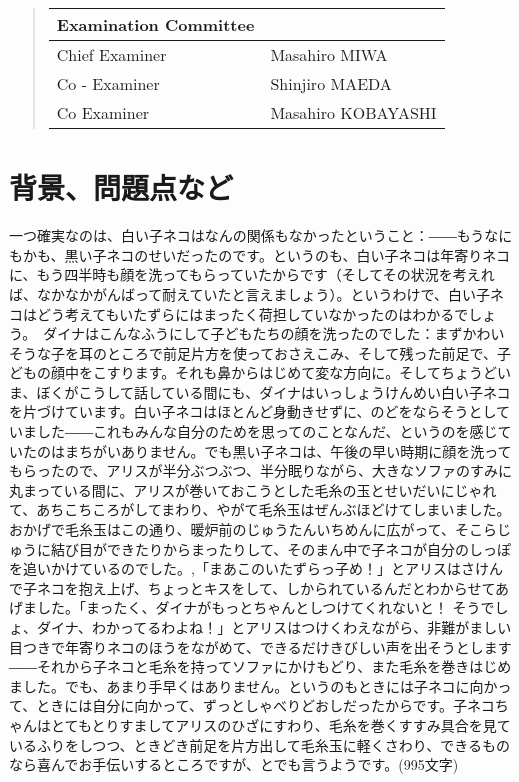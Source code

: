 \documentclass[uplatex,dvipdfmx]{ujarticle}
\begin{document}
\begin{abstract}
\begin{table}[H]
{\begin{tabular}{|l|l|l|l|l|l|l|l|l|l|l|}
\multicolumn{4}{|l|}{Examination Committee} & \multicolumn{7}{l|}{} \\ \hline
\multicolumn{4}{|l|}{Chief Examiner} & \multicolumn{7}{l|}{Masahiro MIWA} \\ \hline
\multicolumn{4}{|l|}{Co - Examiner} & \multicolumn{7}{l|}{Shinjiro MAEDA} \\ \hline
 \multicolumn{4}{|l|}{Co  Examiner} & \multicolumn{7}{l|}{Masahiro KOBAYASHI} \\ \hline
\end{tabular}%
}
\end{table}

\end{abstract}

\afterpage{\clearpage}
\newpage

\tableofcontents

\afterpage{\clearpage}
\newpage

\section{背景、問題点など}
一つ確実なのは、白い子ネコはなんの関係もなかったということ：――もうなにもかも、黒い子ネコのせいだったのです。というのも、白い子ネコは年寄りネコに、もう四半時も顔を洗ってもらっていたからです（そしてその状況を考えれば、なかなかがんばって耐えていたと言えましょう）。というわけで、白い子ネコはどう考えてもいたずらにはまったく荷担していなかったのはわかるでしょう。　ダイナはこんなふうにして子どもたちの顔を洗ったのでした：まずかわいそうな子を耳のところで前足片方を使っておさえこみ、そして残った前足で、子どもの顔中をこすります。それも鼻からはじめて変な方向に。そしてちょうどいま、ぼくがこうして話している間にも、ダイナはいっしょうけんめい白い子ネコを片づけています。白い子ネコはほとんど身動きせずに、のどをならそうとしていました――これもみんな自分のためを思ってのことなんだ、というのを感じていたのはまちがいありません。でも黒い子ネコは、午後の早い時期に顔を洗ってもらったので、アリスが半分ぶつぶつ、半分眠りながら、大きなソファのすみに丸まっている間に、アリスが巻いておこうとした毛糸の玉とせいだいにじゃれて、あちこちころがしてまわり、やがて毛糸玉はぜんぶほどけてしまいました。おかげで毛糸玉はこの通り、暖炉前のじゅうたんいちめんに広がって、そこらじゅうに結び目ができたりからまったりして、そのまん中で子ネコが自分のしっぽを追いかけているのでした。,「まあこのいたずらっ子め！」とアリスはさけんで子ネコを抱え上げ、ちょっとキスをして、しかられているんだとわからせてあげました。「まったく、ダイナがもっとちゃんとしつけてくれないと！ そうでしょ、ダイナ、わかってるわよね！」とアリスはつけくわえながら、非難がましい目つきで年寄りネコのほうをながめて、できるだけきびしい声を出そうとします――それから子ネコと毛糸を持ってソファにかけもどり、また毛糸を巻きはじめました。でも、あまり手早くはありません。というのもときには子ネコに向かって、ときには自分に向かって、ずっとしゃべりどおしだったからです。子ネコちゃんはとてもとりすましてアリスのひざにすわり、毛糸を巻くすすみ具合を見ているふりをしつつ、ときどき前足を片方出して毛糸玉に軽くさわり、できるものなら喜んでお手伝いするところですが、とでも言うようです。(995文字)
\end{document}
